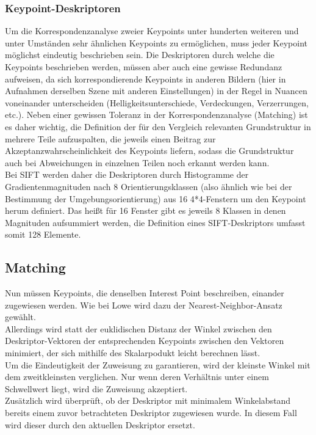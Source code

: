 \documentclass[deutsch]{scrartcl}
\begin{document}
\subsubsection{Keypoint-Deskriptoren}
Um die Korrespondenzanalyse zweier Keypoints unter hunderten weiteren und unter Umständen sehr ähnlichen Keypoints zu ermöglichen, muss jeder Keypoint möglichst eindeutig beschrieben sein. Die Deskriptoren durch welche die Keypoints beschrieben werden, müssen aber auch eine gewisse Redundanz aufweisen, da sich korrespondierende Keypoints in anderen Bildern (hier in Aufnahmen derselben Szene mit anderen Einstellungen) in der Regel in Nuancen voneinander unterscheiden (Helligkeitsunterschiede, Verdeckungen, Verzerrungen, etc.). Neben einer gewissen Toleranz in der Korrespondenzanalyse (Matching) ist es daher wichtig, die Definition der für den Vergleich relevanten Grundstruktur in mehrere Teile aufzuspalten, die jeweils einen Beitrag zur Akzeptanzwahrscheinlichkeit des Keypoints liefern, sodass die Grundstruktur auch bei Abweichungen in einzelnen Teilen noch erkannt werden kann.\\
Bei SIFT werden daher die Deskriptoren durch Histogramme der Gradientenmagnituden nach 8 Orientierungsklassen (also ähnlich wie bei der Bestimmung der Umgebungsorientierung) aus 16 4*4-Fenstern um den Keypoint herum definiert. Das heißt für 16 Fenster gibt es jeweils 8 Klassen in denen Magnituden aufsummiert werden, die Definition eines SIFT-Deskriptors umfasst somit 128 Elemente.\cite{lowe04}

\subsection{Matching} 
Nun müssen Keypoints, die denselben Interest Point beschreiben, einander zugewiesen werden. Wie bei Lowe\cite{lowe04} wird dazu der Nearest-Neighbor-Ansatz gewählt.\\
Allerdings wird statt der euklidischen Distanz der Winkel zwischen den Deskriptor-Vektoren der entsprechenden Keypoints zwischen den Vektoren minimiert, der sich mithilfe des Skalarpodukt leicht berechnen lässt. \\
Um die Eindeutigkeit der Zuweisung zu garantieren, wird der kleinste Winkel mit dem zweitkleinsten verglichen\cite{lowe04}. Nur wenn deren Verhältnis unter einem Schwellwert liegt, wird die Zuweisung akzeptiert.\\
Zusätzlich wird überprüft, ob der Deskriptor mit minimalem Winkelabstand bereits einem zuvor betrachteten Deskriptor zugewiesen wurde. In diesem Fall wird dieser durch den aktuellen Deskriptor ersetzt.\\
\end{document}
